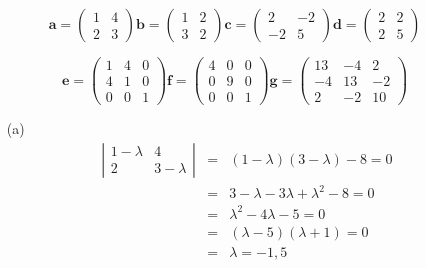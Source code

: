 \documentclass{article}
\begin{document}
\begin{enumerate}
\begin{displaymath}
\boldsymbol{a} = \left( \begin{array}{rr} 1 & 4\\ 2 & 3 \end{array} \right)
\boldsymbol{b} = \left( \begin{array}{rr} 1 & 2 \\ 3 & 2  \end{array} \right)
\boldsymbol{c} = \left( \begin{array}{rr} 2 & -2 \\ -2 & 5 \end{array} \right)
\boldsymbol{d} = \left( \begin{array}{rr} 2 & 2 \\ 2 & 5 \end{array} \right)
\end{displaymath}

\begin{displaymath}
\boldsymbol{e} = \left( \begin{array}{rrr} 1 & 4 & 0\\ 4 & 1 & 0 \\ 0 & 0 & 1 \end{array} \right)
\boldsymbol{f} = \left( \begin{array}{rrr} 4 & 0 & 0 \\ 0  & 9 & 0 \\ 0 & 0 & 1  \end{array} \right)
\boldsymbol{g} = \left( \begin{array}{rrr} 13 & -4 & 2\\ -4 & 13 & -2 \\ 2 & -2 & 10 \end{array} \right)
\end{displaymath}



\begin{itemize}


\item[(a)] 
\begin{eqnarray*}
\left| \begin{array}{cc} 1 - \lambda & 4 \\ 2 & 3-\lambda \end{array}\right| &=& (1-\lambda)(3-\lambda)-8=0\\
&=& 3 - \lambda - 3\lambda + \lambda^{2} - 8 = 0\\
&=& \lambda^{2} - 4\lambda - 5 = 0\\
&=& (\lambda-5)(\lambda+1)=0\\
&=& \lambda = -1,5
\end{eqnarray*}


\end{itemize}
\end{enumerate}
\end{document}
